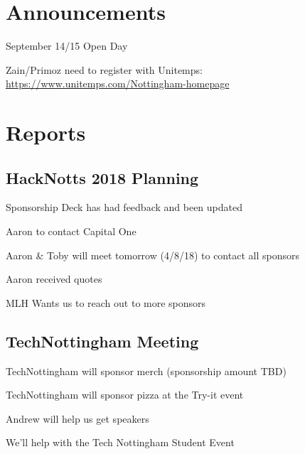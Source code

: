 \documentclass[11pt,hacksoc]{meetingmins}
\begin{document}
\maketitle

\section{Announcements}
\begin{items}
	\item
	September 14/15 Open Day
	
		\subitem
		Zain/Primoz need to register with Unitemps: \hyperlink{https://www.unitemps.com/Nottingham-homepage}{https://www.unitemps.com/Nottingham-homepage}
\end{items}

\section{Reports}

\subsection{HackNotts 2018 Planning}
\begin{hiddensubitems}
	\item
	Sponsorship Deck has had feedback and been updated
	
	\item
	Aaron to contact Capital One
	
	\item
	Aaron \& Toby will meet tomorrow (4/8/18) to contact all sponsors
	
	\item
	Aaron received quotes
	
	\item
	MLH Wants us to reach out to more sponsors
	
\end{hiddensubitems}

\subsection{TechNottingham Meeting}
\begin{hiddensubitems}
	\item
	TechNottingham will sponsor merch (sponsorship amount TBD)
	
	\item
	TechNottingham will sponsor pizza at the Try-it event
	
	\item
	Andrew will help us get speakers
	
	\item
	We'll help with the Tech Nottingham Student Event
	
\end{hiddensubitems}
\end{document}
